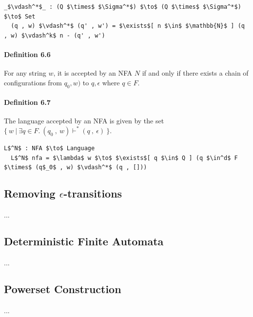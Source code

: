 \documentclass[twoside,openright,final]{bhamthesis}
\begin{document}
\begin{lstlisting}[mathescape=true]
  _$\vdash^*$_ : (Q $\times$ $\Sigma^*$) $\to$ (Q $\times$ $\Sigma^*$) $\to$ Set
  (q , w) $\vdash^*$ (q' , w') = $\exists$[ n $\in$ $\mathbb{N}$ ] (q , w) $\vdash^k$ n - (q' , w')
\end{lstlisting}

\paragraph{Definition 6.6} For any string \(w\), it is accepted by an NFA \(N\)
if and only if there exists a chain of configurations from \(q_0 ,
w)\) to \(q , \epsilon\) where \(q \in F\). 

\paragraph{Definition 6.7} The language accepted by an
NFA is given by the set \(\{\ w\ |\ \exists q\in F.\ (q_0\ ,\
w) \vdash^* (q\ ,\ \epsilon)\ \}\). 

\begin{lstlisting}[mathescape=true]
  L$^N$ : NFA $\to$ Language
  L$^N$ nfa = $\lambda$ w $\to$ $\exists$[ q $\in$ Q ] (q $\in^d$ F $\times$ (q$_0$ , w) $\vdash^*$ (q , []))
\end{lstlisting} 

\subsection{Removing \(\epsilon\)-transitions}
\paragraph{} ...

\subsection{Deterministic Finite Automata}
\paragraph{} ...

\subsection{Powerset Construction}
\paragraph{} ...
\end{document}
